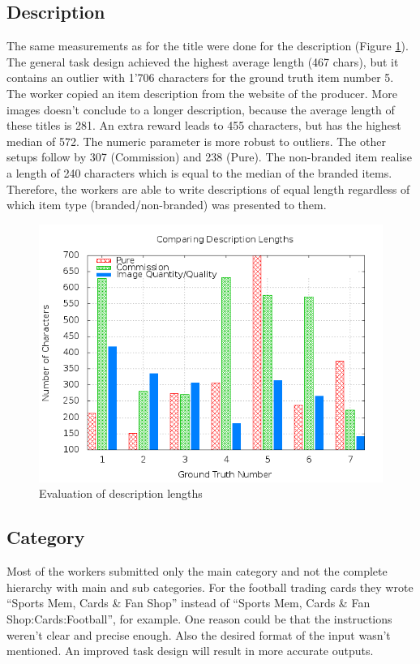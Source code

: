 \subsection{Description}
The same measurements as for the title were done for the description (Figure \ref{crowdsourcing_desc_length}). The general task design achieved the highest average length (467 chars), but it contains an outlier with 1'706 characters for the ground truth item number 5. The worker copied an item description from the website of the producer. More images doesn't conclude to a longer description, because the average length of these titles is 281. An extra reward leads to 455 characters, but has the highest median of 572. The numeric parameter is more robust to outliers. The other setups follow by 307 (Commission) and 238 (Pure). The non-branded item realise a length of 240 characters which is equal to the median of the branded items. Therefore, the workers are able to write descriptions of equal length regardless of which item type (branded/non-branded) was presented to them.
\begin{figure}
\centering
\includegraphics[scale=0.55]{images/plots/crowdsourcing/plot_description_length.png}
\caption{Evaluation of description lengths}
\label{crowdsourcing_desc_length}
\end{figure}

\subsection{Category}
Most of the workers submitted only the main category and not the complete hierarchy with main and sub categories. For the football trading cards they wrote ``Sports Mem, Cards \& Fan Shop'' instead of ``Sports Mem, Cards \& Fan Shop:Cards:Football'', for example. One reason could be that the instructions weren't clear and precise enough. Also the desired format of the input wasn't mentioned. An improved task design will result in more accurate outputs.
